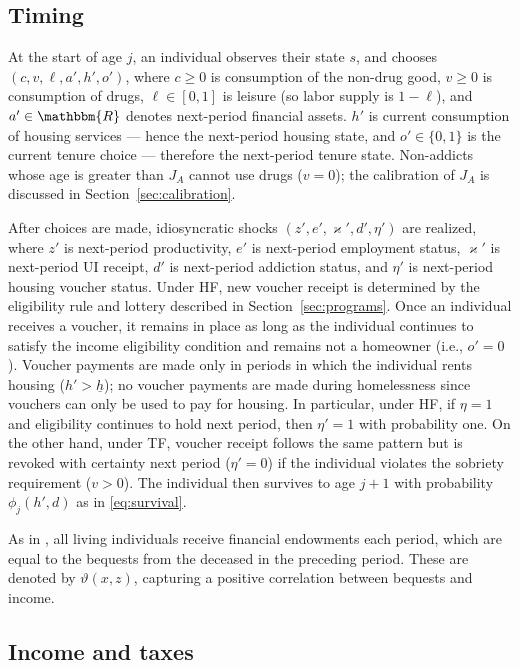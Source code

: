 \documentclass[parskip=full]{article}
\theoremstyle{plain}
\theoremstyle{definition}
\theoremstyle{remark}
\begin{document}
\subsection{Timing}\label{sec:timing}

At the start of age $j$, an individual observes their state $s$, and chooses $(c,v,\ell,a',h',o')$, where $c\ge 0$ is consumption of the non-drug good, $v\ge 0$ is consumption of drugs, $\ell\in[0,1]$ is leisure (so labor supply is $1-\ell$), and $a'\in\mathbbm{R}$ denotes next-period financial assets. $h'$ is current consumption of housing services — hence the next-period housing state, and $o'\in\{0,1\}$ is the current tenure choice — therefore the next-period tenure state. Non-addicts whose age is greater than $J_A$ cannot use drugs ($v=0$); the calibration of $J_A$ is discussed in Section~\ref{sec:calibration}. 

After choices are made, idiosyncratic shocks $(z',e',\varkappa',d',\eta')$ are realized, where $z'$ is next-period productivity, $e'$ is next-period employment status, $\varkappa'$ is next-period UI receipt, $d'$ is next-period addiction status, and $\eta'$ is next-period housing voucher status. Under HF, new voucher receipt is determined by the eligibility rule and lottery described in Section~\ref{sec:programs}. Once an individual receives a voucher, it remains in place as long as the individual continues to satisfy the income eligibility condition and remains not a homeowner (i.e., $o'=0$). Voucher payments are made only in periods in which the individual rents housing ($h'>\underline{h}$); no voucher payments are made during homelessness since vouchers can only be used to pay for housing. In particular, under HF, if $\eta=1$ and eligibility continues to hold next period, then $\eta'=1$ with probability one. On the other hand, under TF, voucher receipt follows the same pattern but is revoked with certainty next period ($\eta'=0$) if the individual violates the sobriety requirement ($v>0$). The individual then survives to age $j+1$ with probability $\phi_j(h',d)$ as in \eqref{eq:survival}. 

As in \citet{kkk-2021}, all living individuals receive financial endowments each period, which are equal to the bequests from the deceased in the preceding period. These are denoted by $\vartheta (x,z)$, capturing a positive correlation between bequests and income.

\subsection{Income and taxes}\label{sec:income}
\end{document}
